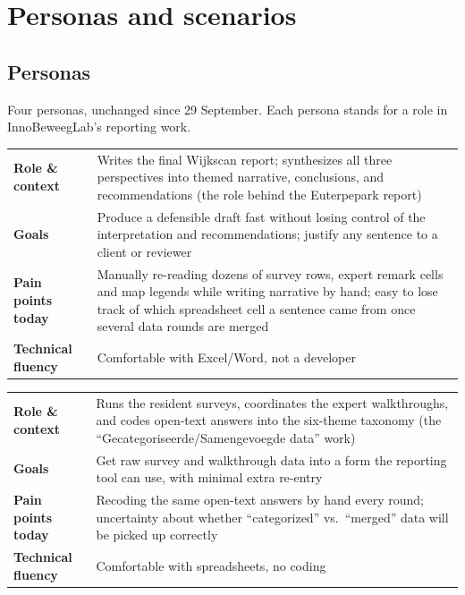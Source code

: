 \section{Personas and scenarios}\label{sec:personas}

\subsection{Personas}

Four personas, unchanged since 29 September. Each persona stands for a role in InnoBeweegLab's reporting work.

\newcommand{\persona}[5]{%
\begin{tcolorbox}[enhanced, breakable, colback=white, colframe=teal, boxrule=0.8pt, arc=2pt,
  left=8pt, right=8pt, top=6pt, bottom=6pt, title={\textbf{#1}}, coltitle=white, colbacktitle=teal]
\small
\begin{tabular}{@{}>{\raggedright\arraybackslash\bfseries}p{2.9cm}>{\raggedright\arraybackslash\hspace{0pt}}p{11.2cm}@{}}
\textcolor{dknavy}{Role \& context} & #2 \\[3pt]
\textcolor{dknavy}{Goals} & #3 \\[3pt]
\textcolor{dknavy}{Pain points today} & #4 \\[3pt]
\textcolor{dknavy}{Technical fluency} & #5 \\
\end{tabular}
\end{tcolorbox}}

\persona{Anouk --- Lead Researcher / Report Author}
{Writes the final Wijkscan report; synthesizes all three perspectives into themed narrative, conclusions, and recommendations (the role behind the Euterpepark report)}
{Produce a defensible draft fast without losing control of the interpretation and recommendations; justify any sentence to a client or reviewer}
{Manually re-reading dozens of survey rows, expert remark cells and map legends while writing narrative by hand; easy to lose track of which spreadsheet cell a sentence came from once several data rounds are merged}
{Comfortable with Excel/Word, not a developer}

\persona{Sam --- Field Researcher / Data Collector}
{Runs the resident surveys, coordinates the expert walkthroughs, and codes open-text answers into the six-theme taxonomy (the ``Gecategoriseerde/Samengevoegde data'' work)}
{Get raw survey and walkthrough data into a form the reporting tool can use, with minimal extra re-entry}
{Recoding the same open-text answers by hand every round; uncertainty about whether ``categorized'' vs.\ ``merged'' data will be picked up correctly}
{Comfortable with spreadsheets, no coding}

